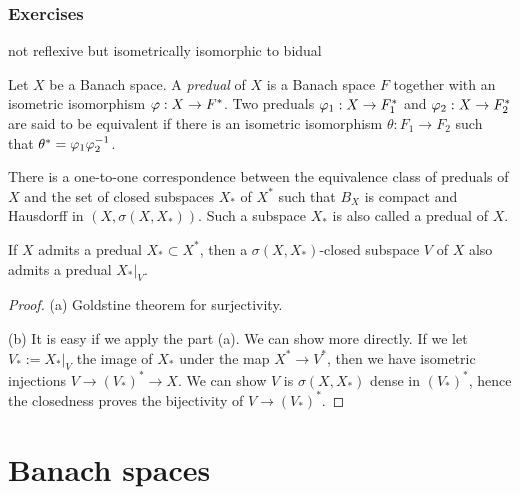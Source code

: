 \documentclass{../../large}
\begin{document}
\section*{Exercises}
\begin{prb}
not reflexive but isometrically isomorphic to bidual
\end{prb}

\begin{prb}[Preduals]
Let $X$ be a Banach space.
A \emph{predual} of $X$ is a Banach space $F$ together with an isometric isomorphism $\varphi:X\to F^*$.
Two preduals $\varphi_1:X\to F_1^*$ and $\varphi_2:X\to F_2^*$ are said to be equivalent if there is an isometric isomorphism $\theta:F_1\to F_2$ such that $\theta^*=\varphi_1\varphi_2^{-1}$.
\begin{parts}
\item There is a one-to-one correspondence between the equivalence class of preduals of $X$ and the set of closed subspaces $X_*$ of $X^*$ such that $B_X$ is compact and Hausdorff in $(X,\sigma(X,X_*))$.
Such a subspace $X_*$ is also called a predual of $X$.
\item If $X$ admits a predual $X_*\subset X^*$, then a $\sigma(X,X_*)$-closed subspace $V$ of $X$ also admits a predual $X_*|_V$.
\end{parts}
\end{prb}
\begin{proof}
(a) Goldstine theorem for surjectivity.

(b)
It is easy if we apply the part (a).
We can show more directly.
If we let $V_*:=X_*|_V$ the image of $X_*$ under the map $X^*\to V^*$, then we have isometric injections $V\to(V_*)^*\to X$.
We can show $V$ is $\sigma(X,X_*)$ dense in $(V_*)^*$, hence the closedness proves the bijectivity of $V\to(V_*)^*$.
\end{proof}

\begin{prb}

\end{prb}



















\part{Banach spaces}
\end{document}
